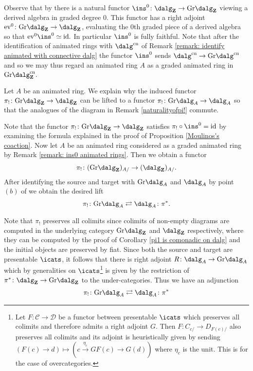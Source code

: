 \documentclass[10pt,reqno]{amsart}
\numberwithin{equation}{section}
\newcommand{\cD}{{\mathcal{D}}}
\newcommand{\cC}{\mathcal{C}}
\newcommand{\ZZ}{\mathbf{Z}}
\newcommand{\Gr}{\mathrm{Gr}}
\newcommand{\id}{\mathrm{id}}
\newcommand{\ev}{\mathrm{ev}}
\newcommand{\cn}{\mathrm{cn}}
\begin{document}
\begin{remark}\label{remark: ins0 animated rings}
    Observe that by \cite[Remark 4.3.6]{Rak20} there is a natural functor $\ins^0\colon \dalg_\ZZ\to \Gr\dalg_\ZZ$ viewing a derived algebra in graded degree $0$. This functor has a right adjoint $\ev^0\colon \Gr\dalg_{\ZZ}\to \dalg_\ZZ$, evaluating the $0$th graded piece of a derived algebra so that $\ev^0\ins^0\simeq \id.$ 
    In particular $\ins^0$ is fully faithful. Note that after the identification of animated rings with $\dalg^\cn$ of Remark \ref{remark: identify animated with connective dalg} the functor $\ins^0$ sends $\dalg^\cn\to \Gr\dalg^\cn$ and so we may thus regard an animated ring $A$ as a graded animated ring in $\Gr\dalg_{\ZZ}^\cn.$ 
\end{remark}
\begin{construction}\label{cons: lifting pi! to animated}
Let $A$ be an animated ring.
    We explain why the induced functor $\pi_!\colon \Gr\dalg_\ZZ\to \dalg_\ZZ$ can be lifted to a functor $\pi_!\colon \Gr\dalg_{A}\to \dalg_A$ so that the analogues of the diagram in Remark \ref{naturalityofpi!} commute.



Note that the functor $\pi_!\colon \Gr\dalg_{\ZZ}\to \dalg_\ZZ$ satisfies $\pi_!\circ \ins^0=\id$ by examining the formula explained in the proof of Proposition \ref{Moulinos's coaction}. Now let $A$ be an animated ring considered as a graded animated ring by Remark \ref{remark: ins0 animated rings}. Then we obtain a functor 
$$\pi_!\colon (\Gr\dalg_\ZZ)_{A/}\to (\dalg_\ZZ)_{A/}.$$
After identifying the source and target with  $\Gr\dalg_{A}$ and $\dalg_{A}$ by point $(b)$ of \cite[Notation 4.2.28]{Rak20} we obtain the desired lift 
$$\pi_!\colon \Gr\dalg_{A} \rightleftarrows \dalg_A \colon \pi^*.$$

Note that $\pi_!$ preserves all colimits since colimits of non-empty diagrams are computed in the underlying category $\Gr\dalg_\ZZ$ and $\dalg_\ZZ$ respectively, where they can be computed by the proof of Corollary \ref{pi1 is comonadic on dalg} and the initial objects are preserved by fiat. Since both the source and target are presentable $\icats$, it follows that there is right adjoint $R\colon \dalg_A\to \Gr\dalg_A$ which by generalities on $\icats$\footnote{Let $F\colon \cC\to \cD$ be a functor between presentable $\icats$ which preserves all colimits and therefore admits a right adjoint $G$. Then $F\colon C_{c/}\to D_{F(c)/}$ also preserves all colimits and its adjoint is heuristically given by sending $(F(c)\to d)\mapsto (c\xrightarrow{\eta_c}GF(c)\to G(d))$ where $\eta_c$ is the unit. This is \cite[Proposition 5.2.5.1]{HTT} for the case of overcategories.} is given by the restriction of $\pi^*\colon \dalg_\ZZ\to \Gr\dalg_{\ZZ}$ to the under-categories. 
Thus we have an adjunction 
$$\pi_!\colon \Gr\dalg_A\rightleftarrows \dalg_A\colon \pi^*$$

\end{construction}
\end{document}

